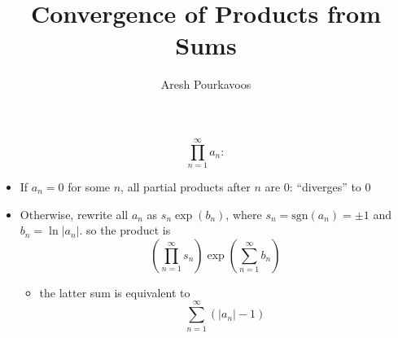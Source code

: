 \documentclass{article}
\begin{document}
\title{Convergence of Products from Sums}
\author{Aresh Pourkavoos}
\maketitle

\[\prod_{n=1}^{\infty}a_n:\]

\begin{itemize}
\item
  If $a_n=0$ for some $n$,
  all partial products after $n$ are 0:
  ``diverges'' to 0
\item
  Otherwise,
  rewrite all $a_n$ as $s_n\exp(b_n)$,
  where $s_n = \mathrm{sgn}(a_n) = \pm 1$
  and $b_n = \ln |a_n|.$
  so the product is
  \[\left(\prod_{n=1}^{\infty}s_n\right)\exp\left(\sum_{n=1}^{\infty}b_n\right)\]
  \begin{itemize}
  \item
    the latter sum is equivalent to
    \[\sum_{n=1}^{\infty}(|a_n|-1)\]
  \end{itemize}  
\end{itemize}
\end{document}
